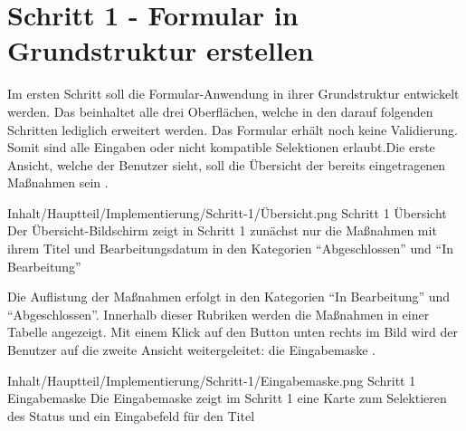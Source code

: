 \section{Schritt 1 - Formular in Grundstruktur erstellen}

Im ersten Schritt soll die Formular-Anwendung in ihrer Grundstruktur entwickelt werden.  Das beinhaltet alle drei Oberflächen, welche in den darauf folgenden Schritten lediglich erweitert werden.  Das Formular erhält noch keine  Validierung. Somit sind alle Eingaben oder nicht kompatible Selektionen erlaubt.Die erste Ansicht, welche der Benutzer sieht, soll die Übersicht der bereits eingetragenen Maßnahmen sein \Abb{\ref{fig:Schritt1Uebersicht}}.

\begin{alexfigure}{Inhalt/Hauptteil/Implementierung/Schritt-1/Übersicht.png}
  {Schritt 1 Übersicht}
  {Der Übersicht-Bildschirm zeigt in  Schritt 1 zunächst nur die Maßnahmen mit ihrem Titel und Bearbeitungsdatum in den Kategorien \enquote{Abgeschlossen} und \enquote{In Bearbeitung}}

  \label{fig:Schritt1Uebersicht}

\end{alexfigure}

Die Auflistung der Maßnahmen erfolgt in den Kategorien \enquote{In Bearbeitung} und \enquote{Abgeschlossen}. Innerhalb dieser Rubriken werden die Maßnahmen in einer Tabelle angezeigt. Mit einem Klick auf den Button unten rechts im Bild wird der Benutzer auf die zweite Ansicht weitergeleitet: die Eingabemaske \Abb{\ref{fig:Schritt1Eingabemaske}}.

\begin{alexfigure}{Inhalt/Hauptteil/Implementierung/Schritt-1/Eingabemaske.png}
  {Schritt 1 Eingabemaske}
  {Die Eingabemaske zeigt im Schritt 1 eine Karte zum Selektieren des Status und ein Eingabefeld für den Titel}

  \label{fig:Schritt1Eingabemaske}

\end{alexfigure}

